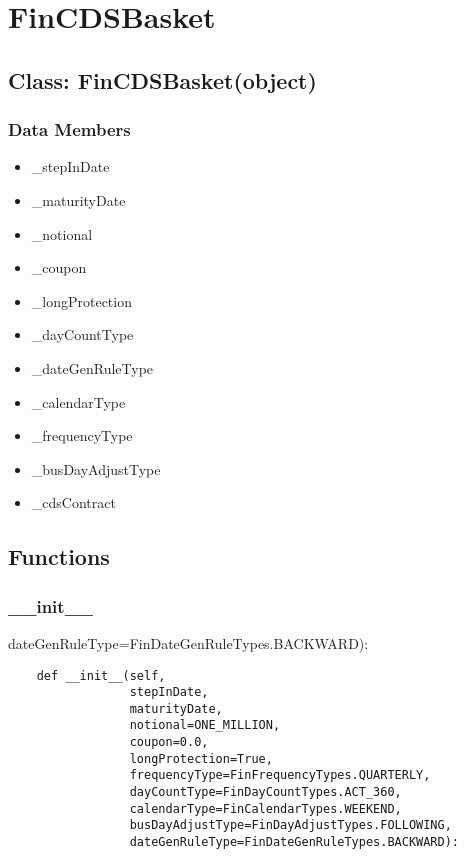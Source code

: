 \documentclass[twoside,11pt]{book}
\begin{document}
\newpage
\section{FinCDSBasket}

\subsection*{Class: FinCDSBasket(object)}


\subsubsection*{Data Members}
\begin{itemize}
\item{\_stepInDate}
\item{\_maturityDate}
\item{\_notional}
\item{\_coupon}
\item{\_longProtection}
\item{\_dayCountType}
\item{\_dateGenRuleType}
\item{\_calendarType}
\item{\_frequencyType}
\item{\_busDayAdjustType}
\item{\_cdsContract}
\end{itemize}

\subsection*{Functions}

\subsubsection*{{\bf \_\_init\_\_}}
dateGenRuleType=FinDateGenRuleTypes.BACKWARD): 

\begin{lstlisting}
    def __init__(self,
                 stepInDate,
                 maturityDate,
                 notional=ONE_MILLION,
                 coupon=0.0,
                 longProtection=True,
                 frequencyType=FinFrequencyTypes.QUARTERLY,
                 dayCountType=FinDayCountTypes.ACT_360,
                 calendarType=FinCalendarTypes.WEEKEND,
                 busDayAdjustType=FinDayAdjustTypes.FOLLOWING,
                 dateGenRuleType=FinDateGenRuleTypes.BACKWARD):
\end{lstlisting}
\end{document}
